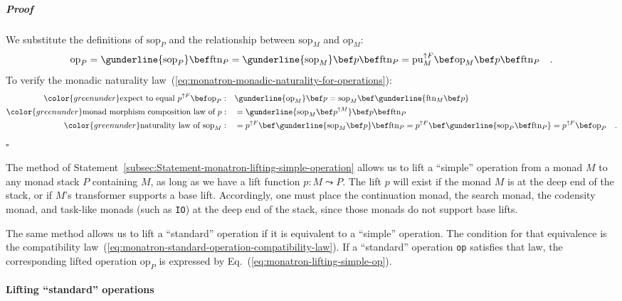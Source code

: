 \subparagraph{Proof}

We substitute the definitions of $\text{sop}_{P}$ and the relationship
between $\text{sop}_{M}$ and $\text{op}_{M}$:
\[
\text{op}_{P}=\gunderline{\text{sop}_{P}}\bef\text{ftn}_{P}=\gunderline{\text{sop}_{M}}\bef p\bef\text{ftn}_{P}=\text{pu}_{M}^{\uparrow F}\bef\text{op}_{M}\bef p\bef\text{ftn}_{P}\quad.
\]
To verify the monadic naturality law~(\ref{eq:monatron-monadic-naturality-for-operations}):
\begin{align*}
{\color{greenunder}\text{expect to equal }p^{\uparrow F}\bef\text{op}_{P}:}\quad & \gunderline{\text{op}_{M}}\bef p=\text{sop}_{M}\bef\gunderline{\text{ftn}_{M}\bef p}\\
{\color{greenunder}\text{monad morphism composition law of }p:}\quad & =\gunderline{\text{sop}_{M}\bef p^{\uparrow M}}\bef p\bef\text{ftn}_{P}\\
{\color{greenunder}\text{naturality law of }\text{sop}_{M}:}\quad & =p^{\uparrow F}\bef\gunderline{\text{sop}_{M}\bef p}\bef\text{ftn}_{P}=p^{\uparrow F}\bef\gunderline{\text{sop}_{P}\bef\text{ftn}_{P}}=p^{\uparrow F}\bef\text{op}_{P}\quad.
\end{align*}
$\square$

The method of Statement~\ref{subsec:Statement-monatron-lifting-simple-operation}
allows us to lift a \textsf{``}simple\textsf{''} operation from a monad $M$ to any
monad stack $P$ containing $M$, as long as we have a lift function
$p:M\leadsto P$. The lift $p$ will exist if the monad $M$ is at
the deep end of the stack, or if $M$\textsf{'}s transformer supports a base
lift. Accordingly, one must place the continuation monad, the search
monad, the codensity monad, and task-like monads (such as \lstinline!IO!)
at the deep end of the stack, since those monads do not support base
lifts.

The same method allows us to lift a \textsf{``}standard\textsf{''} operation if it
is equivalent to a \textsf{``}simple\textsf{''} operation. The condition for that
equivalence is the compatibility law~(\ref{eq:monatron-standard-operation-compatibility-law}).
If a \textsf{``}standard\textsf{''} operation \lstinline!op! satisfies that law,
the corresponding lifted operation $\text{op}_{P}$ is expressed by
Eq.~(\ref{eq:monatron-lifting-simple-op}).

\paragraph{Lifting \textquotedblleft standard\textquotedblright{} operations}

